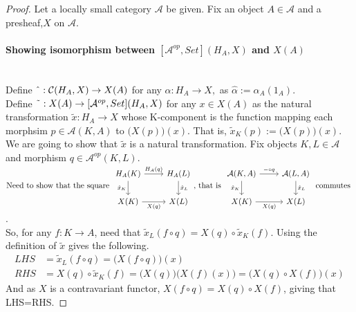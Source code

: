 \documentclass[18pt,a4paper]{article}
\theoremstyle{definition}
\begin{document}
\begin{proof}Let a locally small category $\mathcal{A} $ be given.
	Fix an object $A \in \mathcal{A} $ and a presheaf,$X$ on $\mathcal{A}$.

\paragraph{Showing isomorphism between $[\mathcal{A}^{op},Set](H_A,X)$ and $X(A)$}\mbox{}\\


	Define $\string ^ :\mathcal{C}(H_A,X) \to X(A) $
	for any $\alpha:H_A \to X,$ as  $\hat{\alpha}:= \alpha_A(1_A)$.\\

	Define $\string ~ : X(A) \to [\mathcal{A}^{op}, Set](H_A,X)$
	for any $ x \in X(A)$ as the natural transformation $\tilde{x} : H_A \to X$ whose
	K-component is the function mapping each morphsim $p \in \mathcal{A}(K,A)$
	to $\Big(X(p)\Big)(x)$. That is, $\tilde{x}_K (p):=\Big(X(p)\Big)(x)$.\\

	We are going to show that $\tilde{x}$ is a natural transformation.
	Fix objects $K,L \in \mathcal{A} $ and morphism $q \in \mathcal{A}^{op}(K,L)$.
	$\text{Need to show that the square }
	\begin{tikzcd}
		H_A(K) \arrow[swap]{d}{\tilde{x}_K} \arrow{r}{H_A(q)}
		& H_A(L) \arrow{d}{\tilde{x}_L}\\
		X(K) \arrow[swap]{r}{X(q)}
		& X(L)
	\end{tikzcd} \text{, that is }
	\begin{tikzcd}
		\mathcal{A}(K,A) \arrow[swap]{d}{\tilde{x}_K} \arrow{r}{ - \circ q}
		& \mathcal{A} (L,A) \arrow{d}{\tilde{x}_L}\\
		X(K) \arrow[swap]{r}{X(q)}
		& X(L)
	\end{tikzcd}\text{ commutes }$.\\

	So, for any $f:K\to A$, need that $\tilde{x}_L(f \circ q)= X(q) \circ \tilde{x}_K(f)$. Using
	the definition of $\tilde{x} $ gives the following.
	\begin{align*}
	LHS &=\tilde{x}_L(f \circ q ) =\Big( X(f \circ q)\Big)(x) \\
	RHS &=X(q) \circ \tilde{x}_K(f) =\Big(X(q)\Big) \big(X(f)(x)\big)=\Big(X(q) \circ X(f)\Big) (x)
	\end{align*}
	And as $X$ is a contravariant functor, $X(f \circ q)= X(q) \circ X(f)$, giving that LHS=RHS.


\end{proof}
\end{document}
